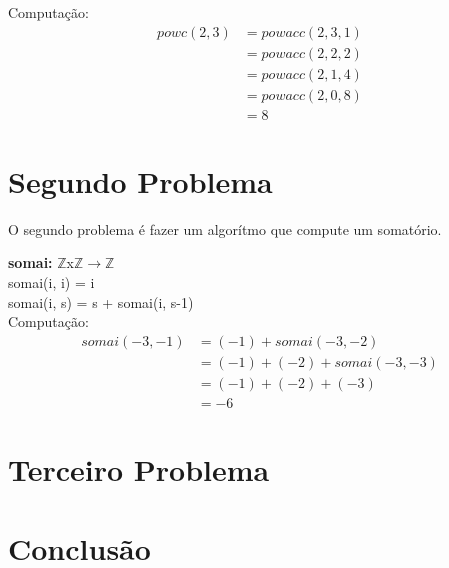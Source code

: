 \documentclass{article}
\begin{document}
Computação:\\
\begin{align*}
powc(2, 3) &= powacc(2, 3, 1)\\
&= powacc(2, 2, 2)\\
&= powacc(2, 1, 4)\\
&= powacc(2, 0, 8)\\
&= 8
\end{align*}

\section{Segundo Problema}
O segundo problema é fazer um algorítmo que compute um somatório.

\noindent \textbf{somai:} $\mathbb{Z}$x$\mathbb{Z}$$\rightarrow \mathbb{Z}$\\
somai(i, i) = i\\
somai(i, s) = s + somai(i, s-1)\\
Computação:
\begin{align*}
somai(-3, -1) &= (-1) + somai(-3, -2)\\
&= (-1) + (-2) + somai(-3, -3)\\
&= (-1) + (-2) + (-3)\\
&= -6
\end{align*}
\section{Terceiro Problema}
\section{Conclusão}
\end{document}
